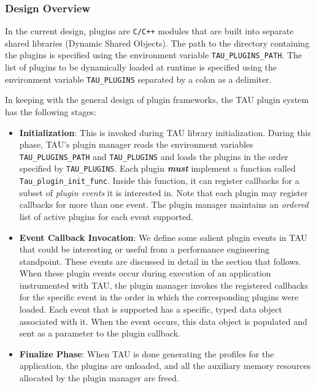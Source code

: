 \subsubsection{Design Overview} In the current design, plugins are \verb+C/+\verb+C+\texttt{++} modules that are built into separate shared libraries (Dynamic Shared Objects). The path to the directory containing the plugins is specified using the environment variable \verb+TAU_PLUGINS_PATH+. The list of plugins to be dynamically loaded at runtime is specified using the environment variable \verb+TAU_PLUGINS+ separated by a colon as a delimiter. 
\par In keeping with the general design of plugin frameworks, the TAU plugin system has the following stages:
\begin {itemize}
\item \textbf{Initialization}: This is invoked during TAU library initialization. During this phase, TAU's plugin manager reads the environment variables \verb+TAU_PLUGINS_PATH+ and \verb+TAU_PLUGINS+ and loads the plugins in the order specified by \verb+TAU_PLUGINS+. Each plugin \textit{\textbf{must}} implement a function called \verb+Tau_plugin_init_func+. Inside this function, it can register callbacks for a subset of \textit{plugin events} it is interested in. Note that each plugin may register callbacks for more than one event. The plugin manager maintains an \textit{ordered} list of active plugins for each event supported.
\item \textbf{Event Callback Invocation}: We define some salient plugin events in TAU that could be interesting or useful from a performance engineering standpoint. These events are discussed in detail in the section that follows. When these plugin events occur during execution of an application instrumented with TAU, the plugin manager invokes the registered callbacks for the specific event in the order in which the corresponding plugins were loaded. Each event that is supported has a specific, typed data object associated with it. When the event occurs, this data object is populated and sent as a parameter to the plugin callback. 
\item \textbf{Finalize Phase}: When TAU is done generating the profiles for the application, the plugins are unloaded, and all the auxiliary memory resources allocated by the plugin manager are freed.
\end{itemize}

